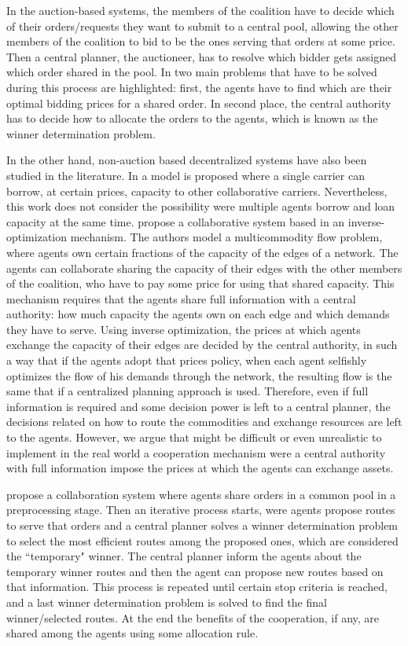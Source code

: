 \documentclass{article}
\begin{document}
In the auction-based systems, the members of the coalition have to decide which of their orders/requests they want to submit to a central pool, allowing the other members of the coalition to bid to be the ones serving that orders at some price. Then a central planner, the auctioneer, has to resolve which bidder gets assigned which order shared in the pool. In \textcite{PAN2019} two main problems that have to be solved during this process are highlighted: first, the agents have to find which are their optimal bidding prices for a shared order. In second place, the central authority has to decide how to allocate the orders to the agents, which is known as the winner determination problem. 

In the other hand, non-auction based decentralized systems have also been studied in the literature. In \textcite{HERNANDEZ2014} a model is proposed where a single carrier can borrow, at certain prices, capacity to other collaborative carriers. Nevertheless, this work does not consider the possibility were multiple agents borrow and loan capacity at the same time. \textcite{AGARWAL2008520}  propose a collaborative system based in an
inverse-optimization mechanism. The authors model a multicommodity flow problem, where agents own certain
fractions of the capacity of the edges of a network. The agents can collaborate sharing the capacity of their edges with the other members of the coalition, who have to pay some price for using that shared capacity. This mechanism requires that the agents share full information with a central authority: how much capacity the agents own on each edge and which demands they have to serve.  Using inverse optimization, the prices at which agents exchange the capacity of their edges are decided by the central authority, in such a way that if the agents adopt that prices policy, when each
agent selfishly optimizes the flow of his demands through the network, the resulting flow is the same that if a centralized planning approach is used. Therefore, even if full information is required and some decision power is left to a central planner, the decisions related on how to route the commodities and exchange resources are left to the agents. However, we argue that might be difficult or even unrealistic to implement in the real world a cooperation mechanism were a central authority with full information impose the prices at which the agents can exchange assets. 

\textcite{WANG2014} propose a collaboration system where agents share orders in a common pool in a preprocessing stage. Then an iterative process starts, were agents propose routes to serve that orders and a central planner solves a winner determination problem to select the most efficient routes among the proposed ones, which are considered the ``temporary" winner. The central planner inform the agents about the temporary winner routes and then the agent can propose new routes based on that information. This process is repeated until certain stop criteria is reached, and a last winner determination problem is solved to find the final winner/selected routes. At the end the benefits of the cooperation, if any, are shared among the agents using some allocation rule.
\end{document}
